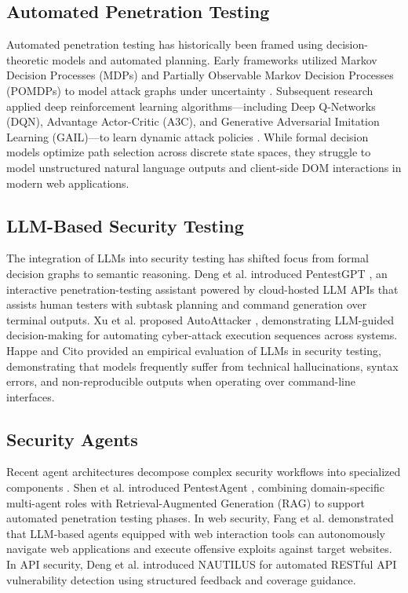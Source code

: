 \documentclass[conference]{IEEEtran}
\begin{document}
\subsection{Automated Penetration Testing}
Automated penetration testing has historically been framed using decision-theoretic models and automated planning. Early frameworks utilized Markov Decision Processes (MDPs) and Partially Observable Markov Decision Processes (POMDPs) \cite{schwartz2020pomdp, sarraute2013pomdp, sarraute2012pomdps, sarraute2011algorithm} to model attack graphs under uncertainty \cite{ammann2002scalable, boddy2005course, durkota2014computing}. Subsequent research applied deep reinforcement learning algorithms—including Deep Q-Networks (DQN), Advantage Actor-Critic (A3C), and Generative Adversarial Imitation Learning (GAIL)—to learn dynamic attack policies \cite{chen2023gailpt, becker2024reinforcement, li2023hierarchical, hu2020automated, zhou2019nigap}. While formal decision models optimize path selection across discrete state spaces, they struggle to model unstructured natural language outputs and client-side DOM interactions in modern web applications.

\subsection{LLM-Based Security Testing}
The integration of LLMs into security testing has shifted focus from formal decision graphs to semantic reasoning. Deng et al. introduced PentestGPT \cite{deng2024pentestgpt}, an interactive penetration-testing assistant powered by cloud-hosted LLM APIs that assists human testers with subtask planning and command generation over terminal outputs. Xu et al. proposed AutoAttacker \cite{xu2024autoattacker}, demonstrating LLM-guided decision-making for automating cyber-attack execution sequences across systems. Happe and Cito \cite{happe2023getting} provided an empirical evaluation of LLMs in security testing, demonstrating that models frequently suffer from technical hallucinations, syntax errors, and non-reproducible outputs when operating over command-line interfaces.

\subsection{Security Agents}
Recent agent architectures decompose complex security workflows into specialized components \cite{autogpt2024, li2023camel}. Shen et al. introduced PentestAgent \cite{shen2025pentestagent}, combining domain-specific multi-agent roles with Retrieval-Augmented Generation (RAG) \cite{lewis2020retrieval} to support automated penetration testing phases. In web security, Fang et al. \cite{fang2024autonomously} demonstrated that LLM-based agents equipped with web interaction tools can autonomously navigate web applications and execute offensive exploits against target websites. In API security, Deng et al. introduced NAUTILUS \cite{deng2023nautilus} for automated RESTful API vulnerability detection using structured feedback and coverage guidance.
\end{document}
